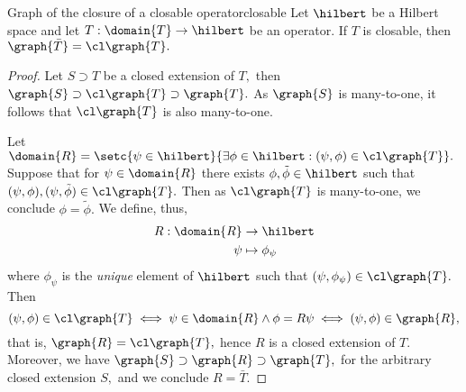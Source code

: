 \begin{proposition}{Graph of the closure of a closable operator}{closable}
    Let \(\hilbert\) be a Hilbert space and let \(T : \domain{T} \to \hilbert\) be an operator. If \(T\) is closable, then \(\graph{\bar{T}} = \cl \graph{T}.\)
\end{proposition}
\begin{proof}
    Let \(S \supset T\) be a closed extension of \(T,\) then \(\graph{S} \supset \cl\graph{T} \supset \graph{T}.\) As \(\graph{S}\) is many-to-one, it follows that \(\cl\graph{T}\) is also many-to-one.

    Let \(\domain{R} = \setc{\psi \in \hilbert}{\exists \phi \in \hilbert : (\psi, \phi) \in \cl \graph{T}}.\) Suppose that for \(\psi \in \domain{R}\) there exists \(\phi, \tilde{\phi} \in \hilbert\) such that \((\psi, \phi), (\psi, \tilde{\phi}) \in \cl\graph{T}.\) Then as \(\cl\graph{T}\) is many-to-one, we conclude \(\phi = \tilde{\phi}.\) We define, thus,
    \begin{align*}
        R : \domain{R} &\to \hilbert\\
                  \psi &\mapsto \phi_\psi
    \end{align*}
    where \(\phi_\psi\) is the \emph{unique} element of \(\hilbert\) such that \((\psi, \phi_\psi) \in \cl\graph{T}.\) Then
    \begin{equation*}
        (\psi, \phi) \in \cl \graph{T} \iff \psi \in \domain{R} \land \phi = R \psi \iff (\psi, \phi) \in \graph{R},
    \end{equation*}
    that is, \(\graph{R} = \cl \graph{T},\) hence \(R\) is a closed extension of \(T.\) Moreover, we have \(\graph{S} \supset \graph{R} \supset \graph{T},\) for the arbitrary closed extension \(S,\) and we conclude \(R = \bar{T}.\)
\end{proof}

